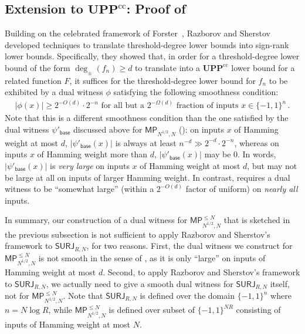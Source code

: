 \documentclass{toc}
\newcommand{\SURJ}{\mathsf{ SURJ}}
\newcommand{\bits}{\{-1,1\}}
\newcommand{\UPPcc}{\mathbf{UPP}^{\text{cc}}}
\begin{document}
\subsection{Extension to \texorpdfstring{$\UPPcc$}{UPPcc}: 
Proof of }
\label{igivethefrigup}
Building on the celebrated framework of Forster~\cite{forster}, Razborov and Sherstov~\cite{razborovsherstov} developed
techniques to translate threshold-degree %
lower bounds into sign-rank lower bounds. Specifically, they showed that, in order for a threshold-degree %
lower bound of the form $\deg_{\pm}(f_n) \geq d$ to translate into a $\UPPcc$ lower bound for a related function $F$,
it suffices for the threshold-degree %
lower bound for $f_n$ to be exhibited by a dual witness $\phi$
satisfying the following smoothness condition:
\begin{align} |\phi(x)| \geq 2^{-O(d)} \cdot 2^{-n} \text{ for all but a } 2^{-\Omega(d)} \text{ fraction of inputs } x \in \bits^n\,. \label{rscondition}\end{align} 
Note
that this is a different smoothness condition than the one satisfied by the dual witness $\psi'_{\textsf{base}}$ discussed above for $\mathsf{MP}_{N^{1/2}, N}$
%
(): %
on inputs $x$ of Hamming weight at most $d$,
$|\psi'_{\textsf{base}}(x)|$ is always at least $n^{-d} \gg 2^{-d} \cdot 2^{-n}$, whereas on inputs $x$ of Hamming weight more than $d$, $|\psi'_{\textsf{base}}(x)|$ may be 0.
In words, $|\psi'_{\textsf{base}}(x)|$ is \emph{very large} on inputs $x$ of Hamming weight at most $d$, but may not be large at all on inputs of larger Hamming weight.
In contrast,  requires a dual witness to be ``somewhat large'' (within a $2^{-O(d)}$ factor of uniform) on \emph{nearly all} inputs. 


In summary, our construction of a dual witness 
for $\mathsf{MP}^{\leq N}_{N^{1/2}, N}$ that is sketched in the previous subsection is not sufficient to apply
Razborov and Sherstov's framework
to $\SURJ_{R, N}$, for two reasons.
First, the dual witness we construct for  $\mathsf{MP}_{N^{1/2}, N}^{\leq N}$ 
is not smooth in the sense of , as it is only ``large'' on inputs of Hamming weight at most $d$.
Second, 
to apply Razborov and Sherstov's framework to $\SURJ_{R, N}$, we actually need to give a smooth dual witness for $\SURJ_{R, N}$ itself, not for $\mathsf{MP}^{\leq N}_{N^{1/2}, N}$. Note that
$\SURJ_{R, N}$ is defined over the domain $\bits^n$ where $n=N \log R$, while $\mathsf{MP}_{N^{1/2}, N}^{\leq N}$ is defined over subset of $\bits^{NR}$ 
consisting of inputs of Hamming weight at most $N$.
\end{document}
